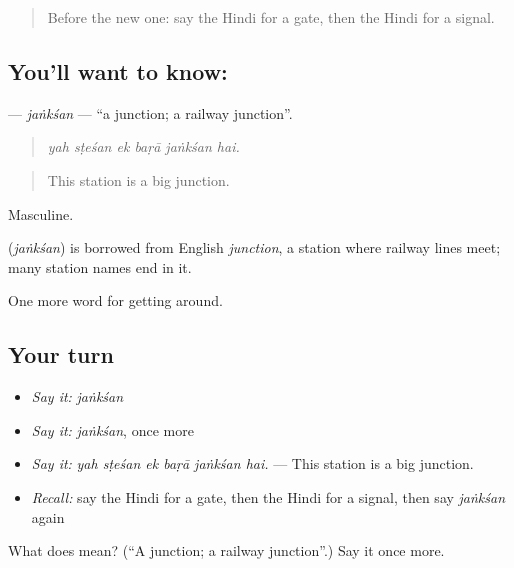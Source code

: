 \begin{quote}
Before the new one: say the Hindi for a gate, then the Hindi for a signal.
\end{quote}

\subsection*{You'll want to know: }
\textbf{} — \emph{jaṅkśan} — \textquotedblleft{}a junction; a railway junction\textquotedblright{}.

\begin{quote}
     
\end{quote}

\begin{quote}
\emph{yah sṭeśan ek baṛā jaṅkśan hai.}
\end{quote}

\begin{quote}
This station is a big junction.
\end{quote}

Masculine.

\begin{cousinweb}
\textbf{} (\emph{jaṅkśan}) is borrowed from English \emph{junction}, a station where railway lines meet; many station names end in it.
\end{cousinweb}

\begin{grammarlens}[title={What you've built}]
One more word for getting around.
\end{grammarlens}

\subsection*{Your turn}
\begin{itemize}
\raggedright
  \item \emph{Say it:} \emph{jaṅkśan}
  \item \emph{Say it:} \emph{jaṅkśan}, once more
  \item \emph{Say it:} \emph{yah sṭeśan ek baṛā jaṅkśan hai.} — This station is a big junction.
  \item \emph{Recall:} say the Hindi for a gate, then the Hindi for a signal, then say \emph{jaṅkśan} again
\end{itemize}

\begin{tcolorbox}[breakable,colback=teal!4,colframe=teal!35!black,title={Before you move on}]
What does  mean? (\textquotedblleft{}A junction; a railway junction\textquotedblright{}.) Say it once more.
\end{tcolorbox}

